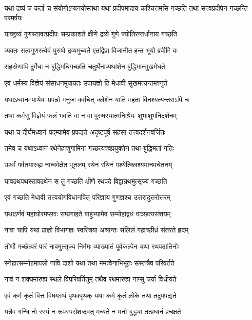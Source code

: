 \threelineshloka
{यथा द्रव्यं च कर्ता च संयोगोऽप्यनयोस्तथा}
{यथा प्रदीपमादाय कश्चित्तमसि गच्छति}
{तथा सत्त्वप्रदीपेन गच्छन्ति परमर्षयः}


\twolineshloka
{यावद्द्रव्यं गुणस्तावत्प्रदीपः सम्प्रकाशते}
{क्षीणे द्रव्ये गुणे ज्योतिरन्तर्धानाय गच्छति}


\twolineshloka
{व्यक्तः सत्वगुणस्त्वेवं पुरुषो द्रव्यमुच्यते}
{एतद्विप्रा विजानीत हन्त भूयो ब्रवीमि वः}


\twolineshloka
{सहस्रेणापि दुर्मेधा न बुद्धिमधिगच्छति}
{चतुर्थेनाप्यथांशेन बुद्धिमान्सुखमेधते}


\twolineshloka
{एवं धर्मस्य विज्ञेयं संसाधनमुपायतः}
{उपायज्ञो हि मेधावी सुखमत्यन्तमश्नुते}


\twolineshloka
{यथाऽध्वानमपाथेयः प्रपन्नो मनुजः क्वचित्}
{क्लेशेन याति महता विनश्यत्यन्तराऽपि च}


\twolineshloka
{तथा कर्मसु विज्ञेयं फलं भवति वा न वा}
{पुरुषस्यात्मनिःश्रेयः शुभाशुभनिदर्शनम्}


\twolineshloka
{यथा च दीर्घमध्वानं पद्म्यामेव प्रपद्यते}
{अदृष्टपूर्वं सहसा तत्त्वदर्शनवर्जितः}


\twolineshloka
{तमेव च यथाऽध्वानं रथेनेहाशुगामिना}
{गच्छत्यश्वप्रयुक्तेन तथा बुद्धिमतां गतिः}


\twolineshloka
{ऊर्ध्वं पर्वतमारुह्य नान्ववेक्षेत भूतलम्}
{रथेन रथिनं पश्येत्क्लिश्यमानमचेतनम्}


\twolineshloka
{यावद्रथपथस्तावद्रथेन स तु गच्छति}
{क्षीणे रथपदे विद्वान्रथमुत्सृज्य गच्छति}


\twolineshloka
{एवं गच्छति मेधावी तत्त्वयोगविधानवित्}
{परिज्ञाय गुणज्ञश्च उत्तरादुत्तरोत्तरम्}


\twolineshloka
{यथाऽर्णवं महाघोरमप्लवः सम्प्रगाहते}
{बाहुभ्यामेव सम्मोहाद्वधं वाञ्छत्यसंशयम्}


\twolineshloka
{नावा चापि यथा प्राज्ञो विभागज्ञः स्वरित्रया}
{अश्रान्तः सलिलं गहाच्छीध्रं संतरते ह्रदम्}


\twolineshloka
{तीर्णो गच्छेत्परं पारं नावमुत्सृज्य निर्ममः}
{व्याख्यातं पूर्वकल्पेन यथा रथपदातिनोः}


\twolineshloka
{स्नेहात्सम्मोहमापन्नो नावि दाशो यथा तथा}
{ममत्वेनाभिभूतः संस्तत्रैव परिवर्तते}


\twolineshloka
{नावं न शक्यमारुह्य स्थले विपरिवर्तितुम्}
{तथैव रथमारुह्य नाप्सु चर्या विधीयते}


\twolineshloka
{एवं कर्म कृतं वित्त विषयस्थं पृथक्पृथक्}
{यथा कर्म कृतं लोके तथा तदुपपद्यते}


\twolineshloka
{यन्नैव गन्धि नो रस्यं न रूपस्पर्सशब्दवत्}
{मन्यते न मनो बुद्ध्या तत्प्रधानं प्रचक्षते}


